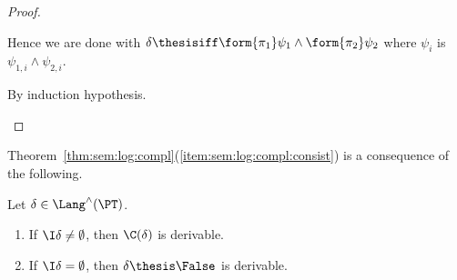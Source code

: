\begin{proof}
\begin{description}
Hence we are done
with $\delta \thesisiff \form{\pi_1}\psi_1 \land \form{\pi_2}\psi_2$
where $\psi_i$ is $\psi_{1,i} \land \psi_{2,i}$.

\item[Item~(\ref{item:proof:sem:log:compl:nf:arrow}).]
By induction hypothesis.
\qedhere
\end{description}
\end{proof}

Theorem~\ref{thm:sem:log:compl}(\ref{item:sem:log:compl:consist})
is a consequence of the following.

\begin{lemma}
\label{lem:proof:sem:log:compl:c-false}
Let $\delta \in \Lang^\land(\PT)$.
\begin{enumerate}[(1)]
\item
\label{item:proof:sem:log:compl:c-false:c}
If $\I\delta \neq \emptyset$,
then $\C(\delta)$ is derivable.


\item
\label{item:proof:sem:log:compl:c-false:ded}
If $\I\delta = \emptyset$,
then $\delta \thesis \False$ is derivable.
\end{enumerate}
\end{lemma}


